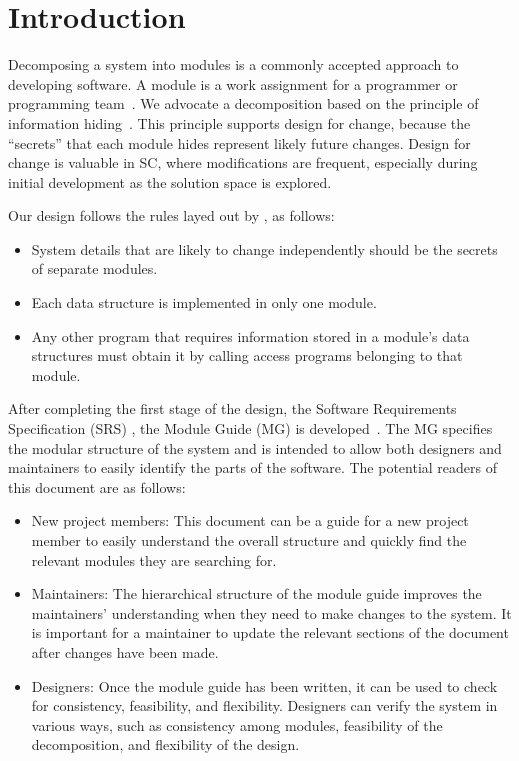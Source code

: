 \documentclass[12pt, titlepage]{article}
\begin{document}
\newpage

\tableofcontents

\listoftables

\listoffigures

\newpage


\section{Introduction}

Decomposing a system into modules is a commonly accepted approach to developing
software.  A module is a work assignment for a programmer or programming
team~\citep{ParnasEtAl1984}.  We advocate a decomposition
based on the principle of information hiding~\citep{Parnas1972a}.  This
principle supports design for change, because the ``secrets'' that each module
hides represent likely future changes.  Design for change is valuable in SC,
where modifications are frequent, especially during initial development as the
solution space is explored.  

Our design follows the rules layed out by \citet{ParnasEtAl1984}, as follows:
\begin{itemize}
\item System details that are likely to change independently should be the
  secrets of separate modules.
\item Each data structure is implemented in only one module.
\item Any other program that requires information stored in a module's data
  structures must obtain it by calling access programs belonging to that module.
\end{itemize}

After completing the first stage of the design, the Software Requirements
Specification (SRS) \cite{SRS}, the Module Guide (MG) is developed~\citep{ParnasEtAl1984}. The MG
specifies the modular structure of the system and is intended to allow both
designers and maintainers to easily identify the parts of the software.  The
potential readers of this document are as follows:

\begin{itemize}
\item New project members: This document can be a guide for a new project member
  to easily understand the overall structure and quickly find the
  relevant modules they are searching for.
\item Maintainers: The hierarchical structure of the module guide improves the
  maintainers' understanding when they need to make changes to the system. It is
  important for a maintainer to update the relevant sections of the document
  after changes have been made.
\item Designers: Once the module guide has been written, it can be used to
  check for consistency, feasibility, and flexibility. Designers can verify the
  system in various ways, such as consistency among modules, feasibility of the
  decomposition, and flexibility of the design.
\end{itemize}
\end{document}
